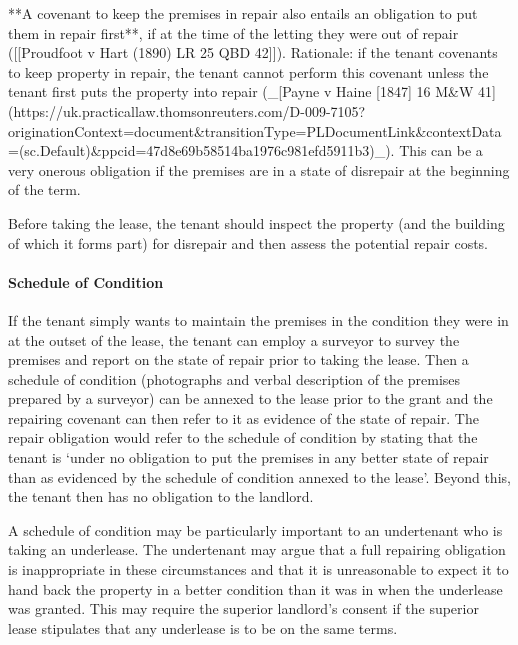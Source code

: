 \documentclass[
]{article}
\newenvironment{Shaded}{}{}
\newcommand{\NormalTok}[1]{#1}
\begin{document}
\begin{Shaded}
\begin{Highlighting}[]
\NormalTok{**A covenant to keep the premises in repair also entails an obligation to put them in repair first**, if at the time of the letting they were out of repair ([[Proudfoot v Hart (1890) LR 25 QBD 42]]). Rationale: if the tenant covenants to keep property in repair, the tenant cannot perform this covenant unless the tenant first puts the property into repair (\_[Payne v Haine [1847] 16 M\&W 41](https://uk.practicallaw.thomsonreuters.com/D{-}009{-}7105?originationContext=document\&transitionType=PLDocumentLink\&contextData=(sc.Default)\&ppcid=47d8e69b58514ba1976c981efd5911b3)\_). This can be a very onerous obligation if the premises are in a state of disrepair at the beginning of the term.}
\end{Highlighting}
\end{Shaded}

\begin{Shaded}
\begin{Highlighting}[]
\NormalTok{Before taking the lease, the tenant should inspect the property (and the building of which it forms part) for disrepair and then assess the potential repair costs.}
\end{Highlighting}
\end{Shaded}

\hypertarget{schedule-of-condition}{%
\paragraph{Schedule of Condition}\label{schedule-of-condition}}

If the tenant simply wants to maintain the premises in the condition
they were in at the outset of the lease, the tenant can employ a
surveyor to survey the premises and report on the state of repair prior
to taking the lease. Then a schedule of condition (photographs and
verbal description of the premises prepared by a surveyor) can be
annexed to the lease prior to the grant and the repairing covenant can
then refer to it as evidence of the state of repair. The repair
obligation would refer to the schedule of condition by stating that the
tenant is `under no obligation to put the premises in any better state
of repair than as evidenced by the schedule of condition annexed to the
lease'. Beyond this, the tenant then has no obligation to the landlord.

A schedule of condition may be particularly important to an undertenant
who is taking an underlease. The undertenant may argue that a full
repairing obligation is inappropriate in these circumstances and that it
is unreasonable to expect it to hand back the property in a better
condition than it was in when the underlease was granted. This may
require the superior landlord's consent if the superior lease stipulates
that any underlease is to be on the same terms.
\end{document}
